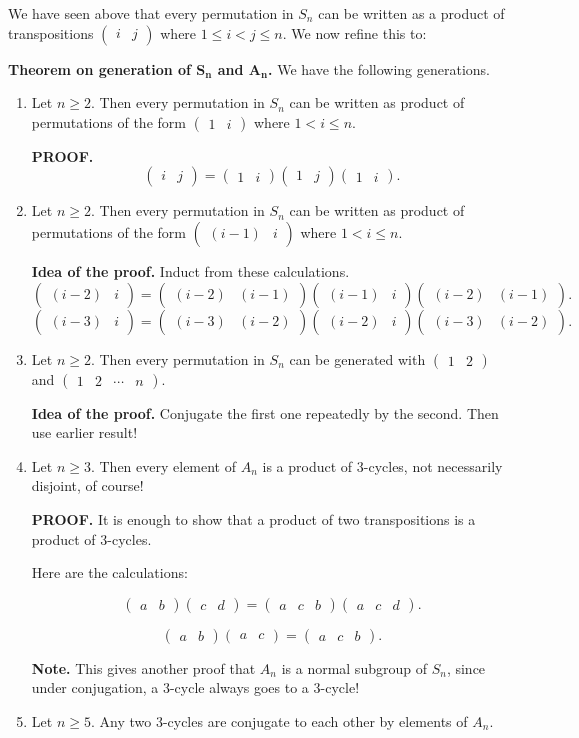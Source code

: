 \documentclass[12pt]{article}
\newcommand{\matr}[2]{\left( \begin{array}{*{#1}{r}}#2\end{array}\right)}
\begin{document}
We have seen above that every permutation in $S_n$ can be written as a
product of transpositions $\matr{2}{i & j}$ where $1\leq i <j \leq n$.
We now refine this to:

{\bf Theorem on generation of $\mathbf{S_n}$ and $\mathbf{A_n}$.}
We have the following generations.
\begin{enumerate}
\item Let $n\geq 2$. Then every permutation in $S_n$ can be written as
product of permutations of the form $\matr{2}{1 & i}$ where $1<i\leq n$.

{\bf PROOF.} $$\matr{2}{i & j} = \matr{2}{1 & i}\matr{2}{1 & j}
\matr{2}{1 & i}.$$

\item Let $n\geq 2$. Then every permutation in $S_n$ can be written as
product of permutations of the form $\matr{2}{(i-1) & i}$ where $1<i\leq
n$.

{\bf Idea of the proof.}
Induct from these calculations.
$$\matr{2}{(i-2) & i} =
\matr{2}{(i-2) & (i-1)} \matr{2}{(i-1)  & i} \matr{2}{(i-2) & (i-1)}.$$
$$\matr{2}{(i-3) & i} =
\matr{2}{(i-3) & (i-2)} \matr{2}{(i-2)  & i} \matr{2}{(i-3) & (i-2)}.$$



\item Let $n\geq 2$. Then every permutation in $S_n$ can be generated with
$\matr{2}{1 & 2}$ and $\matr{4}{1 & 2 & \cdots & n}$.

{\bf Idea of the proof.}
Conjugate the first one repeatedly by the second. Then use earlier
result!

\item Let $n\geq 3$. Then every element of $A_n$ is a product of
$3$-cycles, not necessarily disjoint, of course!

{\bf PROOF.}
It is enough to show that a product of two transpositions is a product
of $3$-cycles.

Here are the calculations:

$$\matr{2}{a & b}\matr{2}{c & d} =
\matr{3}{a & c & b} \matr{3}{a & c & d}.$$

$$\matr{2}{a & b}\matr{2}{a & c} = \matr{3}{ a & c & b}.$$

{\bf Note.} This gives another proof that $A_n$ is a normal subgroup of
$S_n$, since under conjugation, a $3$-cycle always goes to a $3$-cycle!

\item Let $n\geq 5$. Any two $3$-cycles are conjugate to each other by elements
of $A_n$.


\end{enumerate}
\end{document}
